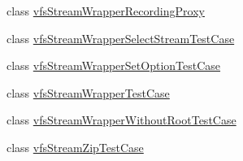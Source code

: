\begin{DoxyCompactItemize}
class \mbox{\hyperlink{classorg_1_1bovigo_1_1vfs_1_1vfs_stream_wrapper_recording_proxy}{vfs\+Stream\+Wrapper\+Recording\+Proxy}}
\item 
class \mbox{\hyperlink{classorg_1_1bovigo_1_1vfs_1_1vfs_stream_wrapper_select_stream_test_case}{vfs\+Stream\+Wrapper\+Select\+Stream\+Test\+Case}}
\item 
class \mbox{\hyperlink{classorg_1_1bovigo_1_1vfs_1_1vfs_stream_wrapper_set_option_test_case}{vfs\+Stream\+Wrapper\+Set\+Option\+Test\+Case}}
\item 
class \mbox{\hyperlink{classorg_1_1bovigo_1_1vfs_1_1vfs_stream_wrapper_test_case}{vfs\+Stream\+Wrapper\+Test\+Case}}
\item 
class \mbox{\hyperlink{classorg_1_1bovigo_1_1vfs_1_1vfs_stream_wrapper_without_root_test_case}{vfs\+Stream\+Wrapper\+Without\+Root\+Test\+Case}}
\item 
class \mbox{\hyperlink{classorg_1_1bovigo_1_1vfs_1_1vfs_stream_zip_test_case}{vfs\+Stream\+Zip\+Test\+Case}}
\end{DoxyCompactItemize}
